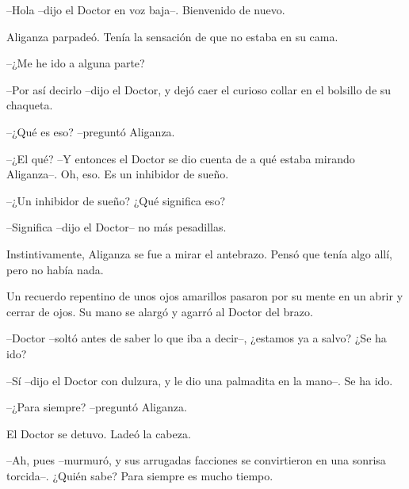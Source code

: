 --Hola --dijo el Doctor en voz baja--. Bienvenido de nuevo.

Aliganza parpadeó. Tenía la sensación de que no estaba en su cama.

--¿Me he ido a alguna parte?

--Por así decirlo --dijo el Doctor, y dejó caer el curioso collar en el bolsillo de su chaqueta.

--¿Qué es eso? --preguntó Aliganza.

--¿El qué? --Y entonces el Doctor se dio cuenta de a qué estaba mirando Aliganza--. Oh, eso. Es un inhibidor de sueño.

--¿Un inhibidor de sueño? ¿Qué significa eso?

--Significa --dijo el Doctor-- no más pesadillas.

Instintivamente, Aliganza se fue a mirar el antebrazo. Pensó que tenía algo allí, pero no había nada.

Un recuerdo repentino de unos ojos amarillos pasaron por su mente en un abrir y cerrar de ojos. Su mano se alargó y agarró al Doctor del brazo.

--Doctor --soltó antes de saber lo que iba a decir--, ¿estamos ya a salvo? ¿Se ha ido?

--Sí --dijo el Doctor con dulzura, y le dio una palmadita en la mano--. Se ha ido.

--¿Para siempre? --preguntó Aliganza.

El Doctor se detuvo. Ladeó la cabeza.

--Ah, pues --murmuró, y sus arrugadas facciones se convirtieron en una sonrisa torcida--. ¿Quién sabe? Para siempre es mucho tiempo.

